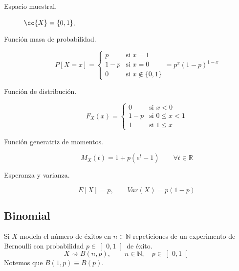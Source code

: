 \begin{description}
    \item [Espacio muestral.]  $\cc{X} = \{0,1\}$.
    \item [Función masa de probabilidad.] 
        \begin{equation*}
            P[X=x]= \left\{\begin{array}{ll}
                p & \text{si\ } x=1 \\
                1-p & \text{si\ } x=0 \\
                0 & \text{si\ } x\notin \{0,1\}
            \end{array}\right.  = p^x{(1-p)}^{1-x}
        \end{equation*}
    \item [Función de distribución.] 
        \begin{equation*}
            F_X(x) = \left\{\begin{array}{ll}
                0 & \text{si\ } x<0 \\
                1-p & \text{si\ } 0\leq x<1 \\
                 1 & \text{si\ } 1\leq x
            \end{array}\right. 
        \end{equation*}
    \item [Función generatriz de momentos.] 
        \begin{equation*}
            M_X(t) = 1+p(e^t-1) \qquad \forall t\in \mathbb{R}
        \end{equation*}
    \item [Esperanza y varianza.] 
        \begin{equation*}
            E[X] = p, \qquad Var(X) = p(1-p)
        \end{equation*}
\end{description}

\subsection{Binomial}
\noindent
Si $X$ modela el número de éxitos en $n\in \mathbb{N}$ repeticiones de un experimento de Bernoulli con probabilidad $p\in \left]0,1\right[$ de éxito.
\begin{equation*}
    X\rightsquigarrow B(n,p), \qquad n\in \mathbb{N},\quad  p\in \left]0,1\right[
\end{equation*}
Notemos que $B(1,p) \equiv B(p)$.

